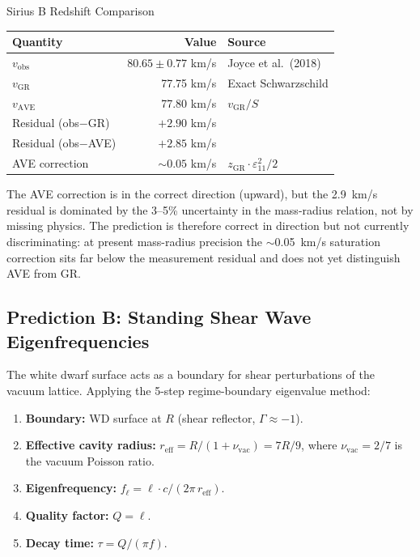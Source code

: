 \begin{resultbox}{Sirius B Redshift Comparison}
\begin{center}
\begin{tabularx}{\textwidth}{@{}lrX@{}}
\toprule
\textbf{Quantity} & \textbf{Value} & \textbf{Source} \\
\midrule
$v_{\text{obs}}$  & $80.65 \pm 0.77$ km/s & Joyce et al.\ (2018) \\
$v_{\text{GR}}$   & 77.75 km/s           & Exact Schwarzschild \\
$v_{\text{AVE}}$  & 77.80 km/s           & $v_{\text{GR}} / S$ \\
Residual (obs$-$GR)  & $+2.90$ km/s    & \\
Residual (obs$-$AVE) & $+2.85$ km/s    & \\
AVE correction       & $\sim 0.05$ km/s & $z_{\text{GR}} \cdot \varepsilon_{11}^2/2$ \\
\bottomrule
\end{tabularx}
\end{center}
\end{resultbox}

\noindent
The AVE correction is in the correct direction (upward), but the 2.9~km/s residual
is dominated by the 3--5\% uncertainty in the mass-radius relation,
not by missing physics.
The prediction is therefore correct in direction but not currently discriminating:
at present mass-radius precision the $\sim$0.05~km/s saturation correction sits far
below the measurement residual and does not yet distinguish AVE from GR.

\subsection{Prediction B: Standing Shear Wave Eigenfrequencies}

The white dwarf surface acts as a boundary for shear perturbations
of the vacuum lattice.  Applying the 5-step regime-boundary eigenvalue method:

\begin{enumerate}
    \item \textbf{Boundary:} WD surface at $R$ (shear reflector, $\Gamma \approx -1$\gammaundeclared{}).
    \item \textbf{Effective cavity radius:} $r_{\text{eff}} = R / (1 + \nu_{\text{vac}}) = 7R/9$,
          where $\nu_{\text{vac}} = 2/7$ is the vacuum Poisson ratio.
    \item \textbf{Eigenfrequency:} $f_\ell = \ell \cdot c / (2\pi \, r_{\text{eff}})$.
    \item \textbf{Quality factor:} $Q = \ell$.
    \item \textbf{Decay time:} $\tau = Q / (\pi f)$.
\end{enumerate}


